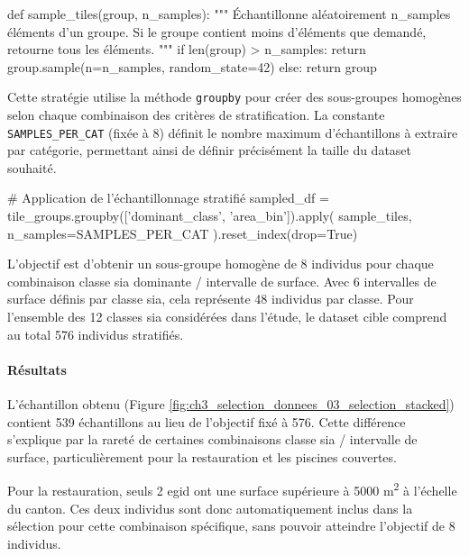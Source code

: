 \vspace{0.35cm}
\begin{pythoncode}
def sample_tiles(group, n_samples):
    """
    Échantillonne aléatoirement n_samples éléments d'un groupe.
    Si le groupe contient moins d'éléments que demandé, retourne tous les éléments.
    """
    if len(group) > n_samples:
        return group.sample(n=n_samples, random_state=42)
    else:
        return group
\end{pythoncode}
\label{code:echantillonnage_tuiles}

Cette stratégie utilise la méthode \texttt{groupby} pour créer des sous-groupes homogènes selon chaque combinaison des critères de stratification. La constante \texttt{SAMPLES\_PER\_CAT} (fixée à 8) définit le nombre maximum d'échantillons à extraire par catégorie, permettant ainsi de définir précisément la taille du dataset souhaité.

\vspace{0.35cm}
\begin{pythoncode}
# Application de l'échantillonnage stratifié
sampled_df = tile_groups.groupby(['dominant_class', 'area_bin']).apply(
    sample_tiles, n_samples=SAMPLES_PER_CAT
).reset_index(drop=True)
\end{pythoncode}
\label{code:application_echantillonnage}

L'objectif est d'obtenir un sous-groupe homogène de 8 individus pour chaque combinaison classe \gls{sia} dominante / intervalle de surface. Avec 6 intervalles de surface définis par classe \gls{sia}, cela représente 48 individus par classe. Pour l'ensemble des 12 classes \gls{sia} considérées dans l'étude, le dataset cible comprend au total 576 individus stratifiés.

\paragraph{Résultats}
L'échantillon obtenu (Figure \ref{fig:ch3_selection_donnees_03_selection_stacked}) contient 539 échantillons au lieu de l'objectif fixé à 576. Cette différence s'explique par la rareté de certaines combinaisons classe \gls{sia} / intervalle de surface, particulièrement pour la restauration et les piscines couvertes.

Pour la restauration, seuls 2 \gls{egid} ont une surface supérieure à 5000 \si{\unit{\square\meter}} à l'échelle du canton. Ces deux individus sont donc automatiquement inclus dans la sélection pour cette combinaison spécifique, sans pouvoir atteindre l'objectif de 8 individus.

